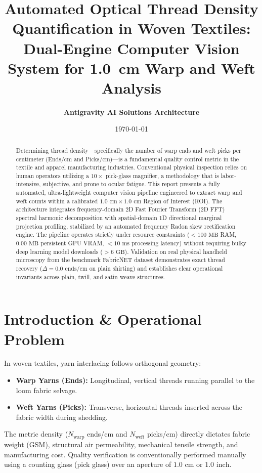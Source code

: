 \documentclass[11pt,a4paper]{article}
\title{\textbf{Automated Optical Thread Density Quantification in Woven Textiles:}\\\large Dual-Engine Computer Vision System for 1.0~cm Warp and Weft Analysis}
\author{\textbf{Antigravity AI Solutions Architecture}}
\date{\today}
\begin{document}
\maketitle

\begin{abstract}
Determining thread density—specifically the number of warp ends and weft picks per centimeter (Ends/cm and Picks/cm)—is a fundamental quality control metric in the textile and apparel manufacturing industries. Conventional physical inspection relies on human operators utilizing a $10\times$ pick-glass magnifier, a methodology that is labor-intensive, subjective, and prone to ocular fatigue. This report presents a fully automated, ultra-lightweight computer vision pipeline engineered to extract warp and weft counts within a calibrated $1.0\text{ cm} \times 1.0\text{ cm}$ Region of Interest (ROI). The architecture integrates frequency-domain 2D Fast Fourier Transform (2D FFT) spectral harmonic decomposition with spatial-domain 1D directional marginal projection profiling, stabilized by an automated frequency Radon skew rectification engine. The pipeline operates strictly under resource constraints ($< 100\text{ MB}$ RAM, $0.00\text{ MB}$ persistent GPU VRAM, $< 10\text{ ms}$ processing latency) without requiring bulky deep learning model downloads ($> 6\text{ GB}$). Validation on real physical handheld microscopy from the benchmark FabricNET dataset demonstrates exact thread recovery ($\Delta = 0.0\text{ ends/cm}$ on plain shirting) and establishes clear operational invariants across plain, twill, and satin weave structures.
\end{abstract}

\section{Introduction \& Operational Problem}

In woven textiles, yarn interlacing follows orthogonal geometry:
\begin{itemize}
    \item \textbf{Warp Yarns (Ends):} Longitudinal, vertical threads running parallel to the loom fabric selvage.
    \item \textbf{Weft Yarns (Picks):} Transverse, horizontal threads inserted across the fabric width during shedding.
\end{itemize}

The metric density ($N_{\text{warp}}$ ends/cm and $N_{\text{weft}}$ picks/cm) directly dictates fabric weight (GSM), structural air permeability, mechanical tensile strength, and manufacturing cost. Quality verification is conventionally performed manually using a counting glass (pick glass) over an aperture of $1.0\text{ cm}$ or $1.0\text{ inch}$.
\end{document}
